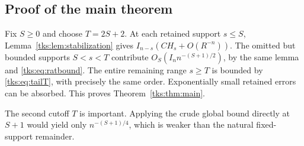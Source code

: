\subsection{Proof of the main theorem}
Fix $S\geq0$ and choose $T=2S+2$. At each retained support $s\leq S$, Lemma~\ref{tks:lem:stabilization} gives
$I_{n-s}(CH_s+O(R^{-n}))$. The omitted but bounded supports $S<s<T$ contribute $O_S(I_n n^{-(S+1)/2})$, by the same lemma and \eqref{tks:eq:ratbound}. The entire remaining range $s\geq T$ is bounded by \eqref{tks:eq:tailT}, with precisely the same order. Exponentially small retained errors can be absorbed. This proves Theorem~\ref{tks:thm:main}.

The second cutoff $T$ is important. Applying the crude global bound directly at $S+1$ would yield only $n^{-(S+1)/4}$, which is weaker than the natural fixed-support remainder.
